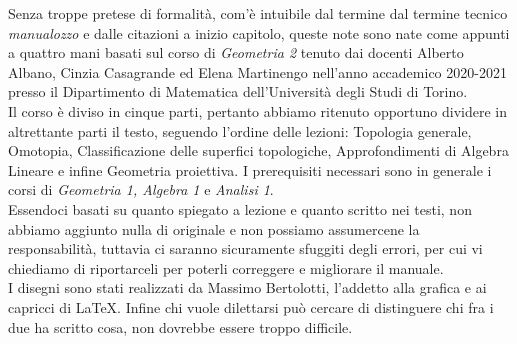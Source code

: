 
	

Senza troppe pretese di formalità, com'è intuibile dal termine dal termine tecnico \textit{manualozzo} e dalle citazioni a inizio capitolo, queste note sono nate come appunti a quattro mani basati sul corso di \textit{Geometria 2} tenuto dai docenti Alberto Albano, Cinzia Casagrande ed Elena Martinengo nell'anno accademico 2020-2021 presso il Dipartimento di Matematica dell'Università degli Studi di Torino.\\
Il corso è diviso in cinque parti, pertanto abbiamo ritenuto opportuno dividere in altrettante parti il testo, seguendo l'ordine delle lezioni: Topologia generale, Omotopia, Classificazione delle superfici topologiche, Approfondimenti di Algebra Lineare e infine Geometria proiettiva. I prerequisiti necessari sono in generale i corsi di \textit{Geometria 1, Algebra 1} e \textit{Analisi 1}.\\
Essendoci basati su quanto spiegato a lezione e quanto scritto nei testi, non abbiamo aggiunto nulla di originale e non possiamo assumercene la responsabilità, tuttavia ci saranno sicuramente sfuggiti degli errori, per cui vi chiediamo di riportarceli
per poterli correggere e migliorare il manuale.\\
I disegni sono stati realizzati da Massimo Bertolotti, l'addetto alla grafica e ai capricci di \LaTeX . Infine chi vuole dilettarsi può cercare di distinguere chi fra i due ha scritto cosa, non dovrebbe essere troppo difficile.

	
	
	
	
	
	
	
	












